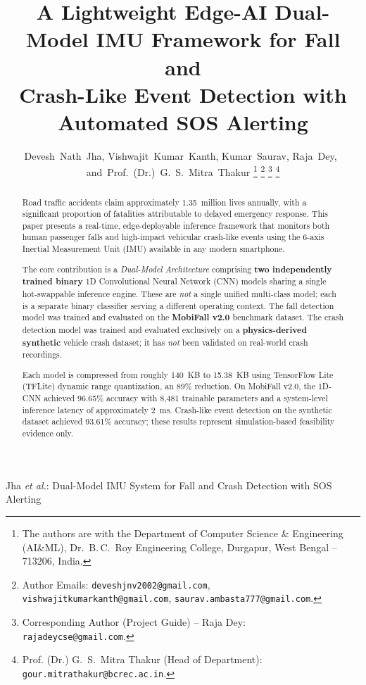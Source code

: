 \documentclass[journal]{IEEEtran}
\begin{document}
\title{A Lightweight Edge-AI Dual-Model IMU Framework for Fall and\\ Crash-Like Event Detection with Automated SOS Alerting}

\author{Devesh~Nath~Jha,
        Vishwajit~Kumar~Kanth,
        Kumar~Saurav,
        Raja~Dey,~\IEEEmembership{}
        and~Prof.~(Dr.)~G.~S.~Mitra~Thakur%
\thanks{The authors are with the Department of Computer Science
\& Engineering (AI\&ML), Dr.~B.\,C.~Roy Engineering College, Durgapur,
West Bengal -- 713206, India.}%
\thanks{Author Emails: {\tt deveshjnv2002@gmail.com},
{\tt vishwajitkumarkanth@gmail.com}, {\tt saurav.ambasta777@gmail.com}.}%
\thanks{Corresponding Author (Project Guide) -- Raja Dey: {\tt rajadeycse@gmail.com}.}%
\thanks{Prof. (Dr.) G.~S.~Mitra Thakur (Head of Department): {\tt gour.mitrathakur@bcrec.ac.in}.}
}


%
{Jha \MakeLowercase{\textit{et al.}}: Dual-Model IMU System for Fall and Crash Detection with SOS Alerting}


\maketitle


\begin{abstract}
Road traffic accidents claim approximately 1.35~million lives annually,
with a significant proportion of fatalities attributable to delayed emergency
response. This paper presents a real-time, edge-deployable inference framework
that monitors both human passenger falls and high-impact vehicular crash-like
events using the 6-axis Inertial Measurement Unit (IMU) available in any
modern smartphone.

The core contribution is a \textit{Dual-Model Architecture} comprising
\textbf{two independently trained binary} 1D Convolutional Neural Network
(CNN) models sharing a single hot-swappable inference engine. These are
\emph{not} a single unified multi-class model; each is a separate binary
classifier serving a different operating context. The fall detection model was
trained and evaluated on the \textbf{MobiFall v2.0} benchmark dataset.
The crash detection model was trained and evaluated exclusively on a
\textbf{physics-derived synthetic} vehicle crash dataset; it has
\emph{not} been validated on real-world crash recordings.

Each model is compressed from roughly 140~KB to 15.38~KB using TensorFlow Lite
(TFLite) dynamic range quantization, an 89\% reduction. On MobiFall v2.0,
the 1D-CNN achieved 96.65\% accuracy with 8,481 trainable parameters and a
system-level inference latency of approximately 2~ms. Crash-like event
detection on the synthetic dataset achieved 93.61\% accuracy; these results
represent simulation-based feasibility evidence only.
\end{abstract}
\end{document}
